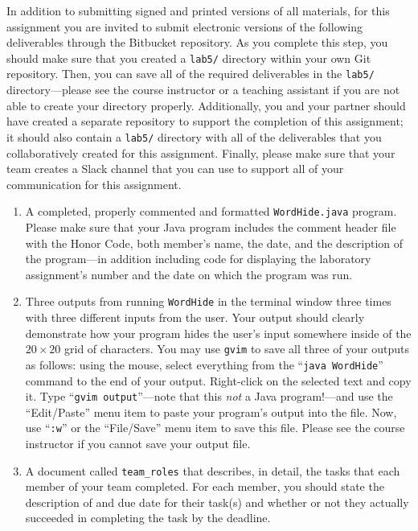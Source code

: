 In addition to submitting signed and printed versions of all materials, for this assignment you are invited to submit
electronic versions of the following deliverables through the Bitbucket repository. As you complete this step, you
should make sure that you created a {\tt lab5/} directory within your own Git repository.  Then, you can save all of the
required deliverables in the {\tt lab5/} directory---please see the course instructor or a teaching assistant if you are
not able to create your directory properly. Additionally, you and your partner should have created a separate repository
to support the completion of this assignment; it should also contain a {\tt lab5/} directory with all of the
deliverables that you collaboratively created for this assignment. Finally, please make sure that your team creates a
Slack channel that you can use to support all of your communication for this assignment.

\begin{enumerate}

        \item A completed, properly commented and formatted {\tt WordHide.java} program. Please make sure that your Java
          program includes the comment header file with the Honor Code, both member's name, the date, and the description of the
          program---in addition including code for displaying the laboratory assignment's number and the date on which
          the program was run.

        \item Three outputs from running {\tt WordHide} in the terminal window three times with three different inputs
          from the user. Your output should clearly demonstrate how your program hides the user's input somewhere inside
          of the $20 \times 20$ grid of characters.  You may use {\tt gvim} to save all three of your outputs as
          follows: using the mouse, select everything from the ``{\tt java WordHide}'' command to the end of your
          output.  Right-click on the selected text and copy it.  Type ``{\tt gvim output}''---note that this {\em not}
          a Java program!---and use the ``Edit/Paste'' menu item to paste your program's output into the file.  Now, use
          ``{\tt :w}'' or the ``File/Save'' menu item to save this file. Please see the course instructor if you cannot
          save your output file.

        \item A document called {\tt team\_roles} that describes, in detail, the tasks that each member of your team
          completed. For each member, you should state the description of and due date for their task(s) and whether or
          not they actually succeeded in completing the task by the deadline.

\end{enumerate}

